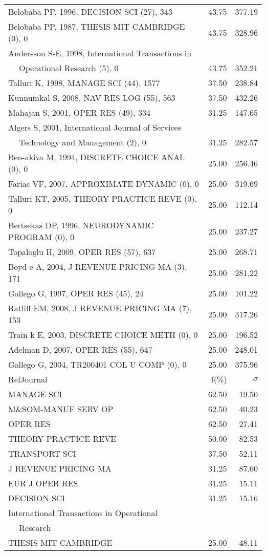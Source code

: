 \documentclass[a4paper,11pt]{report}
\begin{document}
\begin{landscape}
\begin{table}[!ht]
{\begin{tabular}{|l r r|}
Belobaba PP, 1996, DECISION SCI (27), 343 & 43.75 & 377.19\\
Belobaba PP, 1987, THESIS MIT CAMBRIDGE (0), 0 & 43.75 & 328.96\\
Andersson S-E, 1998, International Transactions in &  & \\
$\quad$ Operational Research (5), 0 & 43.75 & 352.21\\
Talluri K, 1998, MANAGE SCI (44), 1577 & 37.50 & 238.84\\
Kunnumkal S, 2008, NAV RES LOG (55), 563 & 37.50 & 432.26\\
Mahajan S, 2001, OPER RES (49), 334 & 31.25 & 147.65\\
Algers S, 2001, International Journal of Services &  & \\
$\quad$ Technology and Management (2), 0 & 31.25 & 282.57\\
Ben-akiva M, 1994, DISCRETE CHOICE ANAL (0), 0 & 25.00 & 256.46\\
Farias VF, 2007, APPROXIMATE DYNAMIC (0), 0 & 25.00 & 319.69\\
Talluri KT, 2005, THEORY PRACTICE REVE (0), 0 & 25.00 & 112.14\\
Bertsekas DP, 1996, NEURODYNAMIC PROGRAM (0), 0 & 25.00 & 237.27\\
Topaloglu H, 2009, OPER RES (57), 637 & 25.00 & 268.71\\
Boyd e A, 2004, J REVENUE PRICING MA (3), 171 & 25.00 & 281.22\\
Gallego G, 1997, OPER RES (45), 24 & 25.00 & 101.22\\
Ratliff EM, 2008, J REVENUE PRICING MA (7), 153 & 25.00 & 317.26\\
Train k E, 2003, DISCRETE CHOICE METH (0), 0 & 25.00 & 196.52\\
Adelman D, 2007, OPER RES (55), 647 & 25.00 & 248.01\\
Gallego G, 2004, TR200401 COL U COMP (0), 0 & 25.00 & 375.96\\
\hline
\hline
RefJournal & f(\%) & $\sigma$\\
\hline
MANAGE SCI & 62.50 & 19.50\\
M\&SOM-MANUF SERV OP & 62.50 & 40.23\\
OPER RES & 62.50 & 27.41\\
THEORY PRACTICE REVE & 50.00 & 82.53\\
TRANSPORT SCI & 37.50 & 52.11\\
J REVENUE PRICING MA & 31.25 & 87.60\\
EUR J OPER RES & 31.25 & 15.11\\
DECISION SCI & 31.25 & 15.16\\
International Transactions in Operational &  & \\
$\quad$ Research &  & \\
THESIS MIT CAMBRIDGE & 25.00 & 48.11\\
\hline
\end{tabular}
}
\end{table}

\end{landscape}
\end{document}
